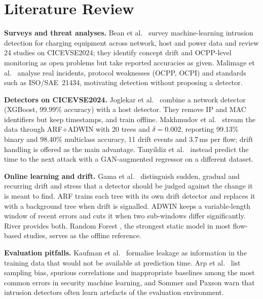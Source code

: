\documentclass[conference]{IEEEtran}
\begin{document}
\section{Literature Review}
\label{sec:lit}

\textbf{Surveys and threat analyses.} Bean et al.\ \cite{b1} survey machine-learning intrusion detection for charging equipment across network, host and power data and review 24 studies on CICEVSE2024; they identify concept drift and OCPP-level monitoring as open problems but take reported accuracies as given. Malimage et al.\ \cite{b3} analyse real incidents, protocol weaknesses (OCPP, OCPI) and standards such as ISO/SAE~21434, motivating detection without proposing a detector.

\textbf{Detectors on CICEVSE2024.} Joglekar et al.\ \cite{b2} combine a network detector (XGBoost, 99.99\% accuracy) with a host detector. They remove IP and MAC identifiers but keep timestamps, and train offline. Makhmudov et al.\ \cite{b4} stream the data through ARF+ADWIN with 20 trees and $\delta = 0.002$, reporting 99.13\% binary and 98.40\% multiclass accuracy, 11 drift events and 3.7\,ms per flow; drift handling is offered as the main advantage. Tanyildiz et al.\ \cite{b5} instead predict the time to the next attack with a GAN-augmented regressor on a different dataset.

\textbf{Online learning and drift.} Gama et al.\ \cite{b15} distinguish sudden, gradual and recurring drift and stress that a detector should be judged against the change it is meant to find. ARF \cite{b6} trains each tree with its own drift detector and replaces it with a background tree when drift is signalled. ADWIN \cite{b7} keeps a variable-length window of recent errors and cuts it when two sub-windows differ significantly. River \cite{b9} provides both. Random Forest \cite{b16}, the strongest static model in most flow-based studies, serves as the offline reference.

\textbf{Evaluation pitfalls.} Kaufman et al.\ \cite{b10} formalise leakage as information in the training data that would not be available at prediction time. Arp et al.\ \cite{b11} list sampling bias, spurious correlations and inappropriate baselines among the most common errors in security machine learning, and Sommer and Paxson \cite{b13} warn that intrusion detectors often learn artefacts of the evaluation environment.
\end{document}
